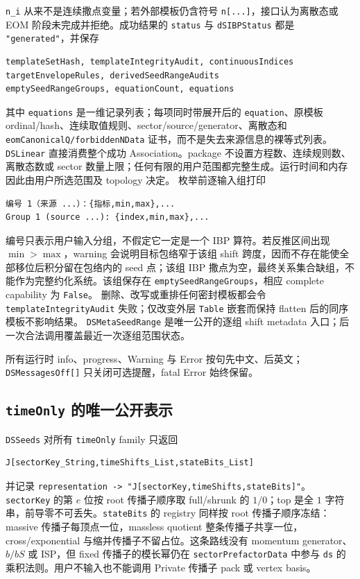 ﻿\documentclass[a4paper,11pt]{article}
\begin{document}
\texttt{n\_i} 从来不是连续撒点变量；若外部模板仍含符号 \texttt{n[...]}，接口认为离散态或
EOM 阶段未完成并拒绝。成功结果的 \texttt{status} 与 \texttt{dSIBPStatus} 都是
\texttt{"generated"}，并保存
\begin{verbatim}
templateSetHash, templateIntegrityAudit, continuousIndices
targetEnvelopeRules, derivedSeedRangeAudits
emptySeedRangeGroups, equationCount, equations
\end{verbatim}
其中 \texttt{equations} 是一维记录列表；每项同时带展开后的 \texttt{equation}、原模板
ordinal/hash、连续取值规则、sector/source/generator、离散态和
\texttt{eomCanonicalQ/forbiddenNData} 证书，而不是失去来源信息的裸等式列表。
\texttt{DSLinear} 直接消费整个成功 Association。package 不设置方程数、连续规则数、离散态数或
sector 数量上限；任何有限的用户范围都完整生成。运行时间和内存因此由用户所选范围及 topology 决定。
枚举前逐输入组打印
\begin{verbatim}
编号 1（来源 ...）：{指标,min,max},...
Group 1 (source ...): {index,min,max},...
\end{verbatim}
编号只表示用户输入分组，不假定它一定是一个 IBP 算符。若反推区间出现 $\min>\max$，warning
会说明目标包络窄于该组 shift 跨度，因而不存在能使全部移位后积分留在包络内的 seed 点；该组
IBP 撒点为空，最终关系集合缺组，不能作为完整约化系统。该组保存在
\texttt{emptySeedRangeGroups}，相应 complete capability 为 \texttt{False}。
删除、改写或重排任何密封模板都会令 \texttt{templateIntegrityAudit} 失败；仅改变外层
\texttt{Table} 嵌套而保持 flatten 后的同序模板不影响结果。
\texttt{DSMetaSeedRange} 是唯一公开的逐组 shift metadata 入口；后一次合法调用覆盖最近一次逐组范围状态。

所有运行时 info、progress、Warning 与 Error 按句先中文、后英文；
\texttt{DSMessagesOff[]} 只关闭可选提醒，fatal Error 始终保留。

\subsection{\texttt{timeOnly} 的唯一公开表示}
\label{sec:timeOnlyRepresentations}

\texttt{DSSeeds} 对所有 \texttt{timeOnly} family 只返回
\begin{verbatim}
J[sectorKey_String,timeShifts_List,stateBits_List]
\end{verbatim}
并记录 \texttt{representation -> "J[sectorKey,timeShifts,stateBits]"}。\texttt{sectorKey} 的第 $e$ 位按 root 传播子顺序取 full/shrunk 的 $1/0$；top 是全 $1$ 字符串，前导零不可丢失。\texttt{stateBits} 的 registry 同样按 root 传播子顺序冻结：massive 传播子每顶点一位，massless quotient 整条传播子共享一位，cross/exponential 与缩并传播子不留占位。这条路线没有 momentum generator、$b/bS$ 或 ISP，但 fixed 传播子的模长幂仍在 \texttt{sectorPrefactorData} 中参与 \texttt{ds} 的乘积法则。用户不输入也不能调用 Private 传播子 pack 或 vertex basis。
\end{document}

